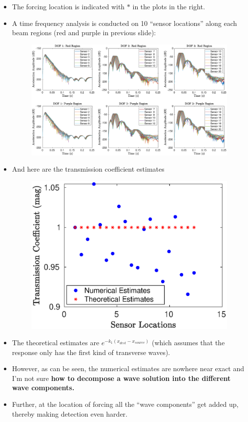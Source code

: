 \documentclass[aspectratio=169]{beamertmd}
\begin{document}
\begin{frame}[allowframebreaks]
\begin{itemize}
\begin{figure}
    \end{figure}
  \item The forcing location is indicated with $*$ in the plots in the
    right.
    \pagebreak
  \item A time frequency analysis is conducted on 10 ``sensor
    locations'' along each beam regions (red and purple in previous slide):
    \begin{figure}
      \centering
      \includegraphics[width=0.7\linewidth]{../../PLANARMODEL/FIGS/FPULSERESP_samppuls}
    \end{figure}
    \pagebreak
  \item And here are the transmission coefficient estimates
    \begin{figure}
      \centering
      \includegraphics[width=0.5\linewidth]{../../PLANARMODEL/FIGS/FPULS_TMsamp}
    \end{figure}
  \item The theoretical estimates are
    $e^{-k_1(x_{dest}-x_{source})}$ (which assumes that the response
    only has the first kind of transverse waves). 
  \item However, as can be seen, the numerical estimates are nowhere
    near exact and I'm not sure \textbf{how to decompose a wave 
      solution into the different wave components.} 
  \item Further, at the location of forcing all the ``wave
    components'' get added up, thereby making detection even harder. 
  \end{itemize}
\end{frame}
\end{document}

